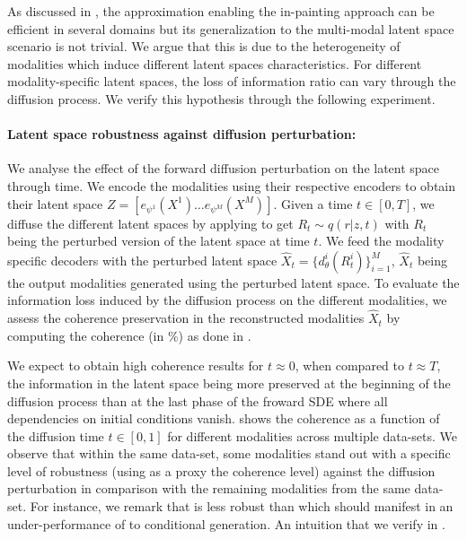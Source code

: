 As discussed in , the approximation enabling the in-painting approach can be efficient in several domains but its generalization to the multi-modal latent space scenario is not trivial. We argue that this is due to the heterogeneity of modalities which induce different latent spaces characteristics. For different modality-specific latent spaces, the loss of information ratio can vary through the diffusion process. We verify this hypothesis through the following experiment.


\paragraph{Latent space robustness against diffusion perturbation:}
We analyse the effect of the forward diffusion perturbation on the latent space through time. We encode the modalities using their respective encoders to obtain their latent space $Z =  [e_{\psi^1}(X^1) \dots e_{\psi^M}(X^M)]$. 
Given a time $t \in [0,T]$, we diffuse the different latent spaces by applying  to get $R_t \sim  q(r|z,t)$ with $R_t$ being the perturbed version of the latent space at time $t$. We feed the modality specific decoders with the perturbed latent space $\hat{X}_t=\{d^i_\theta(R^{i}_t)\}_{i= 1}^M$, $\hat{X}_t$ being the output modalities generated using the perturbed latent space. To evaluate the information loss induced by the diffusion process on the different modalities, we assess the coherence preservation in the reconstructed modalities $\hat{X}_t$ by computing the coherence (in \%) as done in .

We expect to obtain high coherence results for $t \approx 0$, when compared to $t \approx T$, the information in the latent space being more preserved at the beginning of the diffusion process than at the last phase of the froward \gls{SDE} where all dependencies on initial conditions vanish.  shows the coherence as a function of the diffusion time $t \in [0,1]$ for different modalities across multiple data-sets. We observe that within the same data-set, some modalities stand out with a specific level of robustness (using as a proxy the coherence level) against the diffusion perturbation in comparison with the remaining modalities from the same data-set. For instance, we remark that \svhn is less robust than \mnist which should manifest in an under-performance of \svhn to \mnist conditional generation. An intuition that we verify in .



